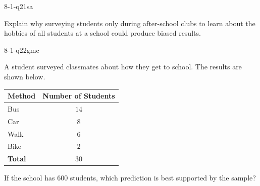 \begin{practiceQuestion}{8-1-q21}{sa}
\begin{questionText}
Explain why surveying students only during after-school clubs to learn about the hobbies of all students at a school could produce biased results.
\end{questionText}
\end{practiceQuestion}


\begin{practiceQuestion}{8-1-q22}{gmc}
\begin{questionText}
A student surveyed classmates about how they get to school. The results are shown below.

\begin{center}
\begin{tabular}{|l|c|}
\hline
\textbf{Method} & \textbf{Number of Students} \\
\hline
Bus & $14$ \\
Car & $8$ \\
Walk & $6$ \\
Bike & $2$ \\
\hline
\textbf{Total} & $30$ \\
\hline
\end{tabular}
\end{center}

If the school has $600$ students, which prediction is best supported by the sample?
\end{questionText}
\end{practiceQuestion}

